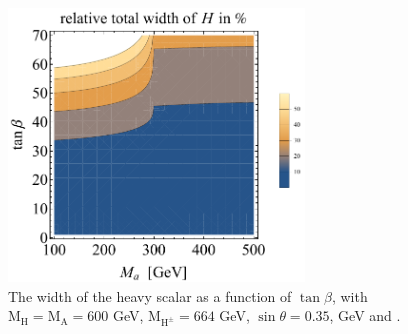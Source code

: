 \begin{figure}
  \centering
  \includegraphics[width=0.7\textwidth]{texinputs/04_grid/figures/DMHF/benchmarking/Gamma5.pdf}
  \caption{The width of the heavy scalar as a function of $\tan\beta$, with $\mathrm{M_H}=\mathrm{M_A}=600$ GeV, $\mathrm{M_{H^{\pm}}}=664$ GeV, $\sin\theta=0.35$,  GeV and .}
  \label{fig:higgsWidth}
\end{figure}

%
%
%
%
%
%
%
%
%
%
%
%
%
%
%


